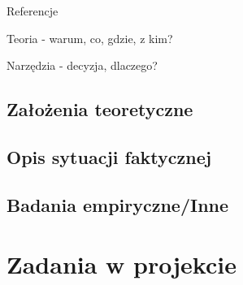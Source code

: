 \documentclass[12pt, a4paper, twoside, openany]{book}
\begin{document}
Referencje

Teoria - warum, co, gdzie, z kim?

Narzędzia - decyzja, dlaczego?

\subsection{Założenia teoretyczne}

\subsection{Opis sytuacji faktycznej}

\subsection{Badania empiryczne/Inne}

\section{Zadania w projekcie}

\newpage
\end{document}
